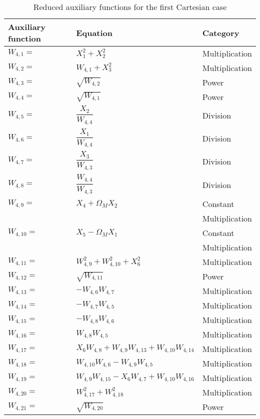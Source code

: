 {\small
\begin{longtable}{|p{1.5cm}|l|p{2cm}|}
\caption{Reduced auxiliary functions for the first Cartesian case}
\label{tab:auxFunc1}
\endfirsthead
\endhead
\hline
\textbf{Auxiliary function} & \textbf{Equation} & \textbf{Category}  \\ \hline \hline
\hline 
$W_{4,1}=$ & $ X_{1}^{2}+X_{2}^{2} $ & Multiplication \\ \hline
$W_{4,2}=$ & $ W_{4,1}+X_{3}^{2} $ & Multiplication \\ \hline
$W_{4,3}=$ & $ \sqrt{W_{4,2}} $ & Power \\ \hline
$W_{4,4}=$ & $ \sqrt{W_{4,1}} $ & Power \\ \hline
$W_{4,5}=$ & $ \dfrac{X_{2}}{W_{4,4}} $ & Division \\ \hline
$W_{4,6}=$ & $ \dfrac{X_{1}}{W_{4,4}} $ & Division \\ \hline
$W_{4,7}=$ & $ \dfrac{X_{3}}{W_{4,3}} $ & Division \\ \hline
$W_{4,8}=$ & $ \dfrac{W_{4,4}}{W_{4,3}} $ & Division \\ \hline
$W_{4,9}=$ & $ X_{4}+\Omega_{M}X_{2} $ & Constant  \\ 
& & Multiplication \\ \hline
$W_{4,10}=$ & $ X_{5}-\Omega_{M}X_{1} $ & Constant  \\ 
& & Multiplication \\ \hline
$W_{4,11}=$ & $ W_{4,9}^{2}+W_{4,10}^{2}+X_{6}^{2} $ & Multiplication \\ \hline
$W_{4,12}=$ & $ \sqrt{W_{4,11}} $ & Power \\ \hline
$W_{4,13}=$ & $ -W_{4,6}W_{4,7} $ & Multiplication \\ \hline
$W_{4,14}=$ & $ -W_{4,7}W_{4,5} $ & Multiplication \\ \hline
$W_{4,15}=$ & $ -W_{4,8}W_{4,6} $ & Multiplication \\ \hline
$W_{4,16}=$ & $ W_{4,8}W_{4,5} $ & Multiplication \\ \hline
$W_{4,17}=$ & $ X_{6}W_{4,8}+W_{4,9}W_{4,13}+W_{4,10}W_{4,14} $ & Multiplication \\ \hline
$W_{4,18}=$ & $ W_{4,10}W_{4,6}-W_{4,9}W_{4,5} $ & Multiplication \\ \hline
$W_{4,19}=$ & $ W_{4,9}W_{4,15}-X_{6}W_{4,7}+W_{4,10}W_{4,16} $ & Multiplication \\ \hline
$W_{4,20}=$ & $ W_{4,17}^{2}+W_{4,18}^{2} $ & Multiplication \\ \hline
$W_{4,21}=$ & $ \sqrt{W_{4,20}} $ & Power \\ \hline

\end{longtable}}
